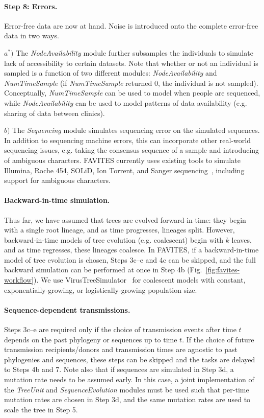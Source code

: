 \paragraph{Step 8: Errors.} Error-free data are now at hand. Noise is introduced onto the complete error-free data in two ways.

$a^*)$ The \textit{NodeAvailability} module further subsamples the individuals to simulate lack of accessibility to certain datasets. Note that whether or not an individual is sampled is a function of two different modules: \textit{NodeAvailability} and \textit{NumTimeSample} (if \textit{NumTimeSample} returned 0, the individual is not sampled). Conceptually, \textit{NumTimeSample} can be used to model when people are sequenced, while \textit{NodeAvailability} can be used to model patterns of data availability (e.g. sharing of data between clinics).

$b)$ The \textit{Sequencing} module simulates sequencing error on the simulated sequences. In addition to sequencing machine errors, this can incorporate other real-world sequencing issues, e.g. taking the consensus sequence of a sample and introducing of ambiguous characters. FAVITES currently uses existing tools to simulate Illumina, Roche 454, SOLiD, Ion Torrent, and Sanger sequencing~\cite{Huang2012,Angly2012}, including support for ambiguous characters.

\paragraph{Backward-in-time simulation.} Thus far, we have assumed that trees are evolved forward-in-time: they begin with a single root lineage, and as time progresses, lineages split. However, backward-in-time models of tree evolution (e.g. coalescent) begin with $k$ leaves, and as time regresses, these lineages coalesce. In FAVITES, if a backward-in-time model of tree evolution is chosen, Steps 3c--e and 4c can be skipped, and the full backward simulation can be performed at once in Step 4b (Fig.~\ref{fig:favites-workflow}). We use VirusTreeSimulator~\cite{Ratmann2017} for coalescent models with constant, exponentially-growing, or logistically-growing population size.

\paragraph{Sequence-dependent transmissions.} Steps 3c--e are required only if the choice of transmission events after time $t$ depends on the past phylogeny or sequences up to time $t$. If the choice of future transmission recipients/donors and transmission times are agnostic to past phylogenies and sequences, these steps can be skipped and the tasks are delayed to Steps 4b and 7. Note also that if sequences are simulated in Step 3d, a mutation rate needs to be assumed early. In this case, a joint implementation of the \textit{TreeUnit} and \textit{SequenceEvolution} modules must be used such that per-time mutation rates are chosen in Step 3d, and the same mutation rates are used to scale the tree in Step 5.

